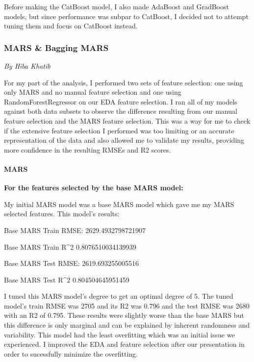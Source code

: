 \documentclass[
  letterpaper,
  DIV=11,
  numbers=noendperiod]{scrartcl}
\let\oldparagraph\paragraph
\renewcommand{\paragraph}[1]{\oldparagraph{#1}\mbox{}}
\begin{document}
Before making the CatBoost model, I also made AdaBoost and GradBoost
models, but since performance was subpar to CatBoost, I decided not to
attempt tuning them and focus on CatBoost instead.

\hypertarget{mars-bagging-mars}{%
\subsubsection{MARS \& Bagging MARS}\label{mars-bagging-mars}}

\emph{By Hiba Khatib}

For my part of the analysis, I performed two sets of feature selection:
one using only MARS and no manual feature selection and one using
RandomForestRegressor on our EDA feature selection. I ran all of my
models against both data subsets to observe the difference resulting
from our manual feature selection and the MARS feature selection. This
was a way for me to check if the extensive feature selection I performed
was too limiting or an accurate representation of the data and also
allowed me to validate my results, providing more confidence in the
resulting RMSEs and R2 scores.

\hypertarget{mars}{%
\paragraph{MARS}\label{mars}}

\textbf{For the features selected by the base MARS model:}

My initial MARS model was a base MARS model which gave me my MARS
selected features. This model's results:

Base MARS Train RMSE: 2629.4932798721907

Base MARS Train R\^{}2 0.8076510034139939

Base MARS Test RMSE: 2619.693255005516

Base MARS Test R\^{}2 0.804504645951459

I tuned this MARS model's degree to get an optimal degree of 5. The
tuned model's train RMSE was 2705 and its R2 was 0.796 and the test RMSE
was 2680 with an R2 of 0.795. These results were slightly worse than the
base MARS but this difference is only marginal and can be explained by
inherent randomness and variability. This model had the least
overfitting which was an initial issue we experienced. I improved the
EDA and feature selection after our presentation in order to sucessfully
minimize the overfitting.
\end{document}
